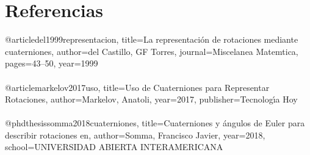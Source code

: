 \documentclass[12pt,a4paper]{report}
\begin{document}
\section{Referencias}
@article{del1999representacion,
  title={La representaci{\'o}n de rotaciones mediante cuaterniones},
  author={del Castillo, GF Torres},
  journal={Miscelanea Matemtica},
  pages={43--50},
  year={1999}
}\\\\
@article{markelov2017uso,
  title={Uso de Cuaterniones para Representar Rotaciones},
  author={Markelov, Anatoli},
  year={2017},
  publisher={Tecnolog{\'\i}a Hoy}
}\\\\
@phdthesis{somma2018cuaterniones,
  title={Cuaterniones y {\'a}ngulos de Euler para describir rotaciones en},
  author={Somma, Francisco Javier},
  year={2018},
  school={UNIVERSIDAD ABIERTA INTERAMERICANA}
}


\end{document}
